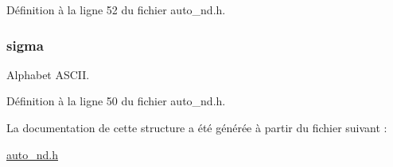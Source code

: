 \-Définition à la ligne 52 du fichier auto\-\_\-nd.\-h.

\hypertarget{struct_automate___n_d_a7933064dbc75475ee4dcd408a4707d0d}{
\subsubsection[{sigma}]{ {\bf sigma}}}\label{struct_automate___n_d_a7933064dbc75475ee4dcd408a4707d0d}
\-Alphabet \-A\-S\-C\-I\-I. 

\-Définition à la ligne 50 du fichier auto\-\_\-nd.\-h.



\-La documentation de cette structure a été générée à partir du fichier suivant \-:\begin{DoxyCompactItemize}
\item 
\hyperlink{auto__nd_8h}{auto\-\_\-nd.\-h}\end{DoxyCompactItemize}
